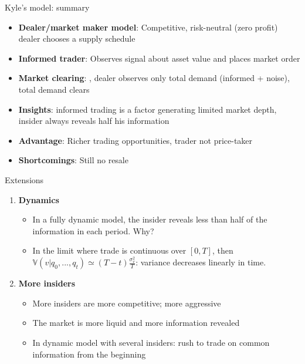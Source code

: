 \documentclass[english,10pt
,aspectratio=169
]{beamer}
\begin{document}
\begin{frame}{Kyle's model: summary}
	\begin{itemize}
		\item \textbf{Dealer/market maker model}: Competitive, risk-neutral (zero profit) dealer chooses a supply schedule
		\item \textbf{Informed trader}: Observes signal about asset value and places market order
		\item \textbf{Market clearing}: , dealer observes only total demand (informed + noise), total demand clears
		\item \textbf{Insights}: informed trading is a factor generating limited market depth, insider always reveals half his information
		\item \textbf{Advantage}: Richer trading opportunities, trader not price-taker
		\item \textbf{Shortcomings}: Still no resale
	\end{itemize}
\end{frame}


\begin{frame}{Extensions}
	\begin{enumerate}
		\item \textbf{Dynamics}
		\begin{itemize}
			\item In a fully dynamic model, the insider reveals less than half of the information in each period. Why?
			\pause {}
			\pause
			\item In the limit where trade is continuous over $[0,T]$, then $\mathbb{V}(v|q_0, ..., q_t) \simeq (T-t)\frac{\sigma^2_v}{T}$: variance decreases linearly in time. 
			\pause {}
		\end{itemize}
		\pause
		\item \textbf{More insiders}
		\begin{itemize}
			\item More insiders are more competitive; more aggressive
			\item The market is more liquid and more information revealed
			\item In dynamic model with several insiders: rush to trade on common information from the beginning
		\end{itemize}
	\end{enumerate}
\end{frame}
\end{document}
